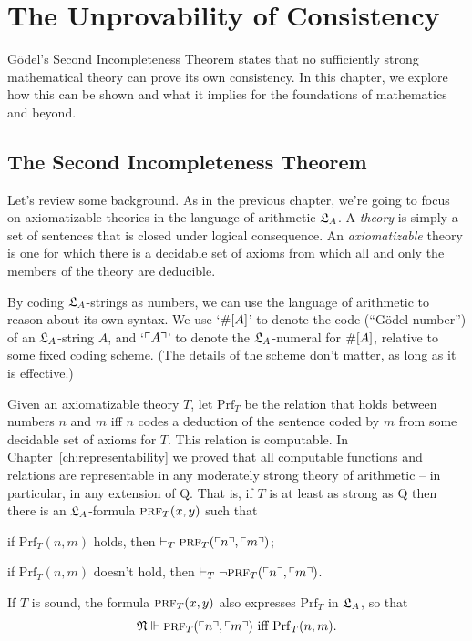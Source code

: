 \setcounter{chapter}{9}
\chapter{The Unprovability of Consistency}\label{ch:goedel2}

Gödel's Second Incompleteness Theorem states that
no sufficiently strong mathematical theory can prove its own consistency.
In this chapter,
we explore how this can be shown and
what it implies for the foundations of mathematics and beyond.

\section{The Second Incompleteness Theorem}

Let's review some background.
As in the previous chapter,
we're going to focus on axiomatizable theories in the language of arithmetic $\mathfrak{L}_A$.
A \emph{theory} is simply a set of sentences
that is closed under logical consequence.
An \emph{axiomatizable} theory is one for which
there is a decidable set of axioms
from which all and only the members of the theory are deducible.

By coding $\mathfrak{L}_A$-strings as numbers,
we can use the language of arithmetic to reason about its own syntax.
We use `$\#[A]$' to denote the code (``Gödel number'') of an $\mathfrak{L}_A$-string $A$,
and `$\ulcorner A \urcorner$' to denote the $\mathfrak{L}_A$-numeral for $\#[A]$,
relative to some fixed coding scheme.
(The details of the scheme don't matter,
as long as it is effective.)

Given an axiomatizable theory $T$,
let $\mathrm{Prf}_{T}$ be the relation that holds between
numbers $n$ and $m$ iff
$n$ codes a deduction of the sentence coded by $m$ from
some decidable set of axioms for $T$.
This relation is computable.
In Chapter~\ref{ch:representability} we proved that
all computable functions and relations are representable in any
moderately strong theory of arithmetic --
in particular,
in any extension of Q.
That is,
if $T$ is at least as strong as Q
then there is an $\mathfrak{L}_A$-formula $\smallcaps{Prf}_T(x,y)$ such that
\begin{cenumerate}
  \item[(i)] if $\mathrm{Prf}_T(n,m)$ holds, then $\proves_T \smallcaps{Prf}_T(\gn{n},\gn{m})$;
  \item[(ii)] if $\mathrm{Prf}_T(n,m)$ doesn't hold, then $\proves_T \neg \smallcaps{Prf}_T(\gn{n},\gn{m})$.
\end{cenumerate}
\noindent%
If $T$ is sound,
the formula $\smallcaps{Prf}_T(x,y)$ also expresses $\mathrm{Prf}_T$ in $\mathfrak{L}_A$,
so that
\begin{equation*}
  \Mod{N} \satisfies \smallcaps{Prf}_T(\gn{n},\gn{m}) \text{ iff } \mathrm{Prf}_T(n,m).
\end{equation*}

